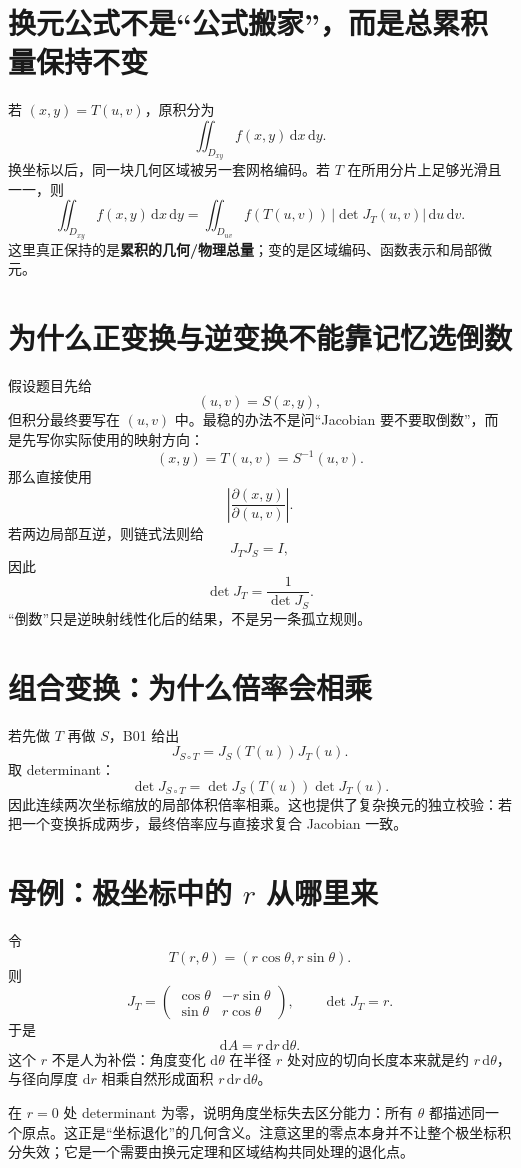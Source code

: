 \documentclass[profile=standard]{ipara-handbook}
\begin{document}
\section{换元公式不是“公式搬家”，而是总累积量保持不变}
若 $(x,y)=T(u,v)$，原积分为
\[
\iint_{D_{xy}} f(x,y)\,\mathrm{d}x\,\mathrm{d}y.
\]
换坐标以后，同一块几何区域被另一套网格编码。若 $T$ 在所用分片上足够光滑且一一，则
\[
\boxed{
\iint_{D_{xy}}f(x,y)\,\mathrm{d}x\,\mathrm{d}y
=
\iint_{D_{uv}}f(T(u,v))\,
\lvert\det J_T(u,v)\rvert\,\mathrm{d}u\,\mathrm{d}v.
}
\]
这里真正保持的是\textbf{累积的几何/物理总量}；变的是区域编码、函数表示和局部微元。

\section{为什么正变换与逆变换不能靠记忆选倒数}
假设题目先给
\[
(u,v)=S(x,y),
\]
但积分最终要写在 $(u,v)$ 中。最稳的办法不是问“Jacobian 要不要取倒数”，而是先写你实际使用的映射方向：
\[
(x,y)=T(u,v)=S^{-1}(u,v).
\]
那么直接使用
\[
\left\lvert\frac{\partial(x,y)}{\partial(u,v)}\right\rvert.
\]
若两边局部互逆，则链式法则给
\[
J_TJ_S=I,
\]
因此
\[
\det J_T=\frac{1}{\det J_S}.
\]
“倒数”只是逆映射线性化后的结果，不是另一条孤立规则。

\section{组合变换：为什么倍率会相乘}
若先做 $T$ 再做 $S$，B01 给出
\[
J_{S\circ T}=J_S(T(u))J_T(u).
\]
取 determinant：
\[
\det J_{S\circ T}
=\det J_S(T(u))\det J_T(u).
\]
因此连续两次坐标缩放的局部体积倍率相乘。这也提供了复杂换元的独立校验：若把一个变换拆成两步，最终倍率应与直接求复合 Jacobian 一致。

\section{母例：极坐标中的 $r$ 从哪里来}
令
\[
T(r,\theta)=(r\cos\theta,r\sin\theta).
\]
则
\[
J_T=
\begin{pmatrix}
\cos\theta&-r\sin\theta\\
\sin\theta&r\cos\theta
\end{pmatrix},
\qquad
\det J_T=r.
\]
于是
\[
\mathrm{d}A=r\,\mathrm{d}r\,\mathrm{d}\theta.
\]
这个 $r$ 不是人为补偿：角度变化 $\mathrm{d}\theta$ 在半径 $r$ 处对应的切向长度本来就是约 $r\,\mathrm{d}\theta$，与径向厚度 $\mathrm{d}r$ 相乘自然形成面积 $r\,\mathrm{d}r\,\mathrm{d}\theta$。

在 $r=0$ 处 determinant 为零，说明角度坐标失去区分能力：所有 $\theta$ 都描述同一个原点。这正是“坐标退化”的几何含义。注意这里的零点本身并不让整个极坐标积分失效；它是一个需要由换元定理和区域结构共同处理的退化点。
\end{document}
